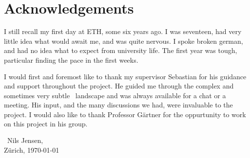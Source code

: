 \chapter*{Acknowledgements}

I still recall my first day at ETH, some six years ago. I was seventeen, had very little idea what would await me, and was quite nervous. I spoke broken german, and had no idea what to expect from university life. The first year was tough, particular finding the pace in the first weeks.

I would first and foremost like to thank my supervisor Sebastian for his guidance and support throughout the project. He guided me through the complex and sometimes very subtle \TFNP\ landscape and was always available for a chat or a meeting. His input, and the many discussions we had, were invaluable to the project. I would also like to thank Professor Gärtner for the oppurtunity to work on this project in his group.

	{\raggedleft\ Nils Jensen,\\ Zürich, \today\par}